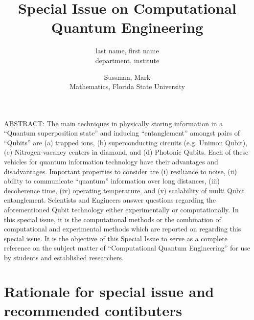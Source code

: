 \documentclass[]{article}
\title{Special Issue on Computational Quantum Engineering}
\author{
  last name, first name \\
  department, institute
  \and
  Sussman, Mark \\
  Mathematics, Florida State University
}
\begin{document}
\maketitle

ABSTRACT:
The main techniques in physically storing information in a ``Quantum superposition state'' and inducing ``entanglement'' amongst pairs of ``Qubits'' are (a) trapped ions, (b) superconducting circuits (e.g. Unimon Qubit), (c) Nitrogen-vacancy centers in diamond, and (d) Photonic Qubits.  Each of these vehicles for quantum information technology have their advantages and disadvantages.  Important properties to consider are (i) resiliance to noise, (ii) ability to communicate ``quantum'' information over long distances, (iii) decoherence time, (iv) operating temperature, and (v) scalability of multi Qubit entanglement.  Scientists and Engineers answer questions regarding the aforementioned Qubit technology either experimentally or computationally.  In this special issue, it is the computational methods or the combination of computational and experimental methods which are reported on regarding this special issue.  It is the objective of this Special Issue to serve as a complete reference on the subject matter of ``Computational Quantum Engineering'' for use by students and established researchers.

\section{Rationale for special issue and recommended contibuters}
\end{document}
